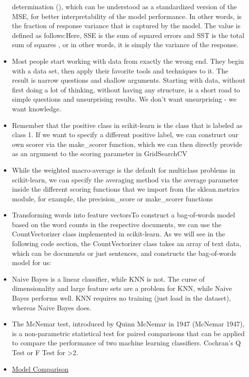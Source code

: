 \documentclass[]{book}
\begin{document}
\begin{itemize}
  determination (), which can be understood as a standardized version of
  the MSE, for better interpretability of the model performance. In
  other words, is the fraction of response variance that is captured by
  the model. The value is defined as follows:Here, SSE is the sum of
  squared errors and SST is the total sum of squares , or in other
  words, it is simply the variance of the response.
\item
  Most people start working with data from exactly the wrong end. They
  begin with a data set, then apply their favorite tools and techniques
  to it. The result is narrow questions and shallow arguments. Starting
  with data, without first doing a lot of thinking, without having any
  structure, is a short road to simple questions and unsurprising
  results. We don't want unsurprising - we want knowledge.
\item
  Remember that the positive class in scikit-learn is the class that is
  labeled as class 1. If we want to specify a different positive label,
  we can construct our own scorer via the make\_scorer function, which
  we can then directly provide as an argument to the scoring parameter
  in GridSearchCV
\item
  While the weighted macro-average is the default for multiclass
  problems in scikit-learn, we can specify the averaging method via the
  average parameter inside the different scoring functions that we
  import from the sklean.metrics module, for example, the
  precision\_score or make\_scorer functions
\item
  Transforming words into feature vectorsTo construct a bag-of-words
  model based on the word counts in the respective documents, we can use
  the CountVectorizer class implemented in scikit-learn. As we will see
  in the following code section, the CountVectorizer class takes an
  array of text data, which can be documents or just sentences, and
  constructs the bag-of-words model for us:
\item
  Naive Bayes is a linear classifier, while KNN is not. The curse of
  dimensionality and large feature sets are a problem for KNN, while
  Naive Bayes performs well. KNN requires no training (just load in the
  dataset), whereas Naive Bayes does.
\item
  The McNemar test, introduced by Quinn McNemar in 1947 (McNemar 1947),
  is a non-parametric statistical test for paired comparisons that can
  be applied to compare the performance of two machine learning
  classifiers. Cochran's Q Test or F Test for \textgreater{}2.
\item
  \href{http://hunch.net/?p=224}{Model Comparison}
\end{itemize}
\end{document}
